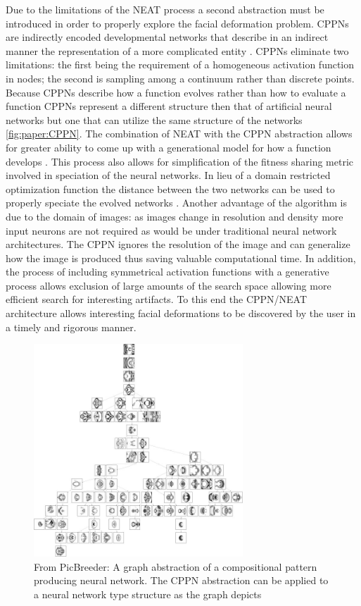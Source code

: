 Due to the limitations of the NEAT process a second abstraction must be introduced in order to properly explore the facial 
deformation problem. CPPNs are indirectly encoded developmental networks that describe in an indirect manner the representation
of a more complicated entity \cite{stanley2007compositional}. CPPNs eliminate two limitations: the first
being the requirement of a homogeneous activation function in nodes; the second is sampling among a continuum rather than
discrete points. Because CPPNs describe how a function evolves rather than how to evaluate a function CPPNs represent a
different structure then that of artificial neural networks but one that can utilize the same structure of the networks
\ref{fig:paper:CPPN}. The combination of NEAT with the CPPN abstraction allows for greater ability to come up with a
generational model for how a function develops \cite{stanley2007compositional}. This process also allows for simplification
of the fitness sharing metric involved in speciation of the neural networks. In lieu of a domain restricted optimization
function the distance between the two networks can be used to properly speciate the evolved networks \cite{stanley2007compositional}.
Another advantage of the algorithm is due to the domain of images: as images change in resolution and density more
input neurons are not required as would be under traditional neural network architectures. The CPPN ignores the resolution
of the image and can generalize how the image is produced thus saving valuable computational time. In addition, the process of
including symmetrical activation functions with a generative process allows exclusion of large amounts of the search space
allowing more efficient search for interesting artifacts. To this end the CPPN/NEAT architecture allows interesting facial
deformations to be discovered by the user in a timely and rigorous manner.

\begin{figure}
 \centering
 \label{fig:paper:picbreed}
 \includegraphics[width=0.7\textwidth]{../../rec/paper/picbreed.jpg}
 \caption{From PicBreeder: A graph abstraction of a compositional pattern producing neural network. The CPPN abstraction can be applied to a neural network type structure as the graph depicts \cite{stnaleypicbreed}}
\end{figure}

